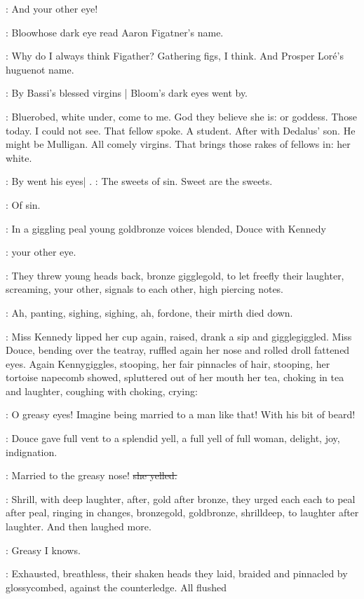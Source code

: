 \MissD:
And your other eye!

:
Bloowhose dark eye read Aaron Figatner's name.

\BloomInt:
Why do I always
think Figather? Gathering figs, I think.
And Prosper Loré's huguenot name.

:
By Bassi's blessed virgins |
Bloom's dark eyes went by.

\BloomInt:
Bluerobed, white
under, come to me. God they believe she is: or goddess. Those today. I
could not see. That fellow spoke. A student. After with Dedalus' son. He
might be Mulligan. All comely virgins. That brings those rakes of fellows
in: her white.

:
By went his eyes|
.
\BloomInt:
The sweets of sin. Sweet are the sweets.

\BloomInt:
Of sin.

:
In a giggling peal young goldbronze voices blended, Douce with
Kennedy

\MissK:
your other eye.

:
They threw young heads back, bronze gigglegold,
to let freefly their laughter, screaming, your other,
signals to each
other,  high piercing notes.

:
Ah, panting, sighing, sighing, ah, fordone,
their mirth died down.

:
Miss Kennedy lipped her cup again, raised, drank a sip and
gigglegiggled. Miss Douce, bending over the teatray, ruffled again her
nose and rolled droll fattened eyes. Again Kennygiggles, stooping, her
fair pinnacles of hair, stooping, her tortoise napecomb showed, spluttered
out of her mouth her tea, choking in tea and laughter, coughing with
choking, crying:

\MissK:
O greasy eyes! Imagine being married to a man like that!
With his bit
of beard!

:
Douce gave full vent to a splendid yell, a full yell of full woman,
delight, joy, indignation.

\MissD:
Married to the greasy nose!
\sout{she yelled.}

:
Shrill, with deep laughter, after, gold after bronze, they urged each
each to peal after peal, ringing in changes, bronzegold, goldbronze,
shrilldeep, to laughter after laughter. And then laughed more.

\MissK:
Greasy I knows.

:
Exhausted, breathless, their shaken heads they laid, braided and
pinnacled by glossycombed, against the counterledge. All flushed

